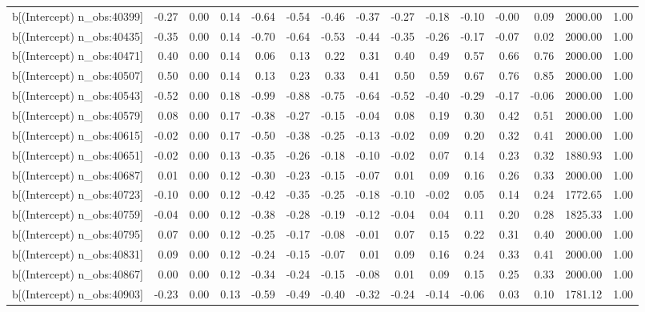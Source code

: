 \begin{table}[ht]
\begin{tabular}{rrrrrrrrrrrrrrr}
  b[(Intercept) n\_obs:40399] & -0.27 & 0.00 & 0.14 & -0.64 & -0.54 & -0.46 & -0.37 & -0.27 & -0.18 & -0.10 & -0.00 & 0.09 & 2000.00 & 1.00 \\ 
  b[(Intercept) n\_obs:40435] & -0.35 & 0.00 & 0.14 & -0.70 & -0.64 & -0.53 & -0.44 & -0.35 & -0.26 & -0.17 & -0.07 & 0.02 & 2000.00 & 1.00 \\ 
  b[(Intercept) n\_obs:40471] & 0.40 & 0.00 & 0.14 & 0.06 & 0.13 & 0.22 & 0.31 & 0.40 & 0.49 & 0.57 & 0.66 & 0.76 & 2000.00 & 1.00 \\ 
  b[(Intercept) n\_obs:40507] & 0.50 & 0.00 & 0.14 & 0.13 & 0.23 & 0.33 & 0.41 & 0.50 & 0.59 & 0.67 & 0.76 & 0.85 & 2000.00 & 1.00 \\ 
  b[(Intercept) n\_obs:40543] & -0.52 & 0.00 & 0.18 & -0.99 & -0.88 & -0.75 & -0.64 & -0.52 & -0.40 & -0.29 & -0.17 & -0.06 & 2000.00 & 1.00 \\ 
  b[(Intercept) n\_obs:40579] & 0.08 & 0.00 & 0.17 & -0.38 & -0.27 & -0.15 & -0.04 & 0.08 & 0.19 & 0.30 & 0.42 & 0.51 & 2000.00 & 1.00 \\ 
  b[(Intercept) n\_obs:40615] & -0.02 & 0.00 & 0.17 & -0.50 & -0.38 & -0.25 & -0.13 & -0.02 & 0.09 & 0.20 & 0.32 & 0.41 & 2000.00 & 1.00 \\ 
  b[(Intercept) n\_obs:40651] & -0.02 & 0.00 & 0.13 & -0.35 & -0.26 & -0.18 & -0.10 & -0.02 & 0.07 & 0.14 & 0.23 & 0.32 & 1880.93 & 1.00 \\ 
  b[(Intercept) n\_obs:40687] & 0.01 & 0.00 & 0.12 & -0.30 & -0.23 & -0.15 & -0.07 & 0.01 & 0.09 & 0.16 & 0.26 & 0.33 & 2000.00 & 1.00 \\ 
  b[(Intercept) n\_obs:40723] & -0.10 & 0.00 & 0.12 & -0.42 & -0.35 & -0.25 & -0.18 & -0.10 & -0.02 & 0.05 & 0.14 & 0.24 & 1772.65 & 1.00 \\ 
  b[(Intercept) n\_obs:40759] & -0.04 & 0.00 & 0.12 & -0.38 & -0.28 & -0.19 & -0.12 & -0.04 & 0.04 & 0.11 & 0.20 & 0.28 & 1825.33 & 1.00 \\ 
  b[(Intercept) n\_obs:40795] & 0.07 & 0.00 & 0.12 & -0.25 & -0.17 & -0.08 & -0.01 & 0.07 & 0.15 & 0.22 & 0.31 & 0.40 & 2000.00 & 1.00 \\ 
  b[(Intercept) n\_obs:40831] & 0.09 & 0.00 & 0.12 & -0.24 & -0.15 & -0.07 & 0.01 & 0.09 & 0.16 & 0.24 & 0.33 & 0.41 & 2000.00 & 1.00 \\ 
  b[(Intercept) n\_obs:40867] & 0.00 & 0.00 & 0.12 & -0.34 & -0.24 & -0.15 & -0.08 & 0.01 & 0.09 & 0.15 & 0.25 & 0.33 & 2000.00 & 1.00 \\ 
  b[(Intercept) n\_obs:40903] & -0.23 & 0.00 & 0.13 & -0.59 & -0.49 & -0.40 & -0.32 & -0.24 & -0.14 & -0.06 & 0.03 & 0.10 & 1781.12 & 1.00 \\ 

\end{tabular}
\end{table}

